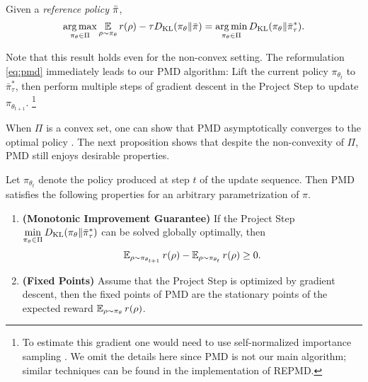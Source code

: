 \begin{prop}
\label{prop:mirrordescent_projection}
Given a \emph{reference policy} $\bar{\pi}$,
\[
 \operatorname*{arg\,max}\limits_{\pi_\theta \in \Pi} { \operatorname*{\mathbb{E}}\limits_{\rho \sim \pi_\theta}{  r(\rho)  - \tau D_{\mathrm{KL}}(\pi_\theta \| \bar{\pi}) } } 
 = \operatorname*{arg\,min}\limits_{\pi_\theta \in \Pi}{ D_{\mathrm{KL}}(\pi_\theta \| \bar{\pi}_\tau^*) }.
\]
\end{prop}

Note that this result holds even for the non-convex setting.
%
The reformulation \cref{eq:pmd} immediately leads to our PMD algorithm:
Lift the current policy $\pi_{\theta_t}$ to $\bar{\pi}_\tau^*$,
then perform multiple steps of gradient descent in the Project Step
to update $\pi_{\theta_{t+1}}$.%
%
\footnote{
To estimate this gradient one would need to use self-normalized importance
sampling \cite{owen2013monte}.
We omit the details here since PMD is not our main algorithm;
similar techniques can be found in the implementation of REPMD. 
}

When $\Pi$ is a convex set, one can show that PMD asymptotically converges to the optimal policy \citep{nemirovskii1983problem,beck2003mirror}. 
The next proposition shows that despite the non-convexity of $\Pi$,
PMD still enjoys desirable properties.

\begin{prop}
\label{prop:monoto_policymirrordescent}
Let $\pi_{\theta_{t}}$ denote the policy produced at step $t$ of
the update sequence.
Then PMD satisfies the following properties for an arbitrary 
parametrization of $\pi$.
\begin{enumerate}
	\item {\bf (Monotonic Improvement Guarantee)} 
	If the Project Step $\min\limits_{\pi_\theta \in \Pi}{D_{\mathrm{KL}}( \pi_\theta \| \bar{\pi}_{\tau}^* )}$ can be solved globally optimally, then
	 \begin{equation*}
	\operatorname{\mathbb{E}}_{\rho \sim \pi_{\theta_{t+1}}}{r(\rho)} - \operatorname{\mathbb{E}}_{\rho \sim \pi_{\theta_{t}}}{  r(\rho)} \ge 0.
	\end{equation*}
	\item {\bf (Fixed Points)} Assume that the Project Step is optimized by gradient descent, then the fixed points of PMD are the 
	 stationary points of the expected reward $\operatorname{\mathbb{E}}_{\rho \sim \pi_\theta}{  r(\rho)}$. 
\end{enumerate}
\end{prop}

